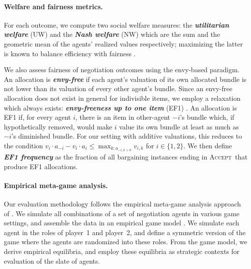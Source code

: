 \documentclass{article}
\theoremstyle{plain}
\theoremstyle{definition}
\theoremstyle{remark}
\newcommand{\term}[1]{\textbf{\textit{#1}}}
\newcommand{\ACCEPT}{\textsc{Accept}}
\newcommand{\WALK}{\textsc{Walk}}
\begin{document}
\paragraph{Welfare and fairness metrics.} 
For each outcome, we compute two social welfare measures: the \term{utilitarian welfare} (UW) and the \term{Nash welfare} (NW) which are the sum and the geometric mean of the agents' realized values respectively; maximizing the latter is known to balance efficiency with fairness \citep{Caragiannis2019Unreasonable}.

We also assess fairness of negotiation outcomes using the envy-based paradigm.
An allocation is \term{envy-free} if each agent's valuation of its own allocated bundle is not lower than its valuation of every other agent's bundle. 
Since an envy-free allocation does not exist in general for indivisible items, we employ a relaxation which always exists: \term{envy-freeness up to one item} (EF1) \citep{Lipton2004Approximately,Budish11}. 
An allocation is EF1 if, for every agent $i$, there is an item in other-agent $-i$'s bundle which, if hypothetically removed, would make $i$ value its own bundle at least as much as $-i$'s diminished bundle. 
For our setting with additive valuations, this reduces to the condition $ v_i \cdot a_{-i} -v_i \cdot a_i\le\max_{k:a_{-i,k > 0}}v_{i,k}$ for $i\in\{1,2\}$. %
We then define \term{EF1 frequency} as the fraction of all  bargaining instances ending in \ACCEPT\ that produce EF1 allocations. %

\paragraph{Empirical meta-game analysis.}
Our evaluation methodology follows the empirical meta-game analysis approach of \citet{li2024meta}.
We simulate all combinations of a set of negotiation agents in various game settings, and assemble the data in an empirical game model \citep{Wellman25tg}.
We simulate each agent in the roles of player~1 and player~2, and define a symmetric version of the game where the agents are randomized into these roles.
From the game model, we derive empirical equilibria, and employ these equilibria as strategic contexts for evaluation of the slate of agents.
\end{document}
